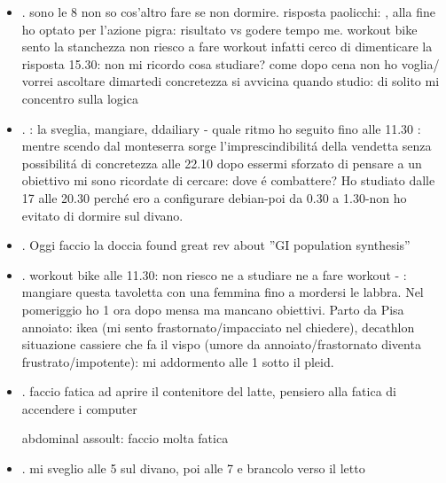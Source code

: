 \begin{itemize}
 
il mio tempo viene deformato dalle interazoni e sprecato in coazioni
tempo post cena noia sonno
\item {}.
sono le 8 non so cos'altro fare se non dormire.
risposta paolicchi: , 
alla fine ho optato per l'azione pigra: risultato vs godere tempo me.
workout bike sento la stanchezza
non riesco a fare workout infatti cerco di dimenticare la risposta
15.30: non mi ricordo cosa studiare? come dopo cena non ho voglia/ vorrei ascoltare dimartedi concretezza si avvicina quando studio: di solito mi concentro sulla logica 
\item {}.
: la sveglia, mangiare, ddailiary - quale ritmo ho seguito fino alle 11.30
: mentre scendo dal monteserra sorge l'imprescindibilit\'a della vendetta senza possibilit\'a di concretezza 
alle 22.10 dopo essermi sforzato di pensare a un obiettivo mi sono ricordate di cercare: dove \'e combattere?
Ho studiato dalle 17 alle 20.30  perch\'e ero a configurare debian-poi da 0.30 a 1.30-non ho evitato di dormire sul divano.
\item {}.
Oggi faccio la doccia
found great rev about ''GI population synthesis''
\item {}.
workout bike alle 11.30: non riesco ne a studiare ne a fare workout - : mangiare questa tavoletta con una femmina fino a mordersi le labbra.
Nel pomeriggio ho 1 ora dopo mensa ma mancano obiettivi.
Parto da Pisa annoiato: ikea (mi sento frastornato/impacciato nel chiedere), decathlon situazione cassiere che fa il vispo (umore da annoiato/frastornato diventa frustrato/impotente): 
mi addormento alle 1 sotto il pleid.
\item {}.
faccio fatica ad aprire il contenitore del latte, pensiero alla fatica di accendere i computer

abdominal assoult: faccio molta fatica
\item {}.
mi sveglio alle 5 sul divano, poi alle 7 e brancolo verso il letto


\end{itemize}
